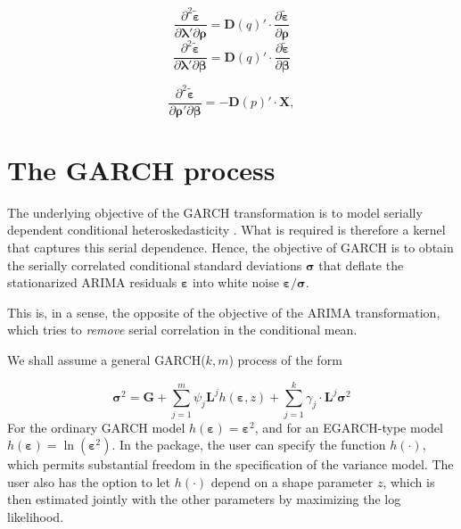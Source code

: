 \documentclass[12pt]{article}
\begin{document}
\begin{equation}
\frac{\partial^{2} \tilde{\boldsymbol{\varepsilon}}}{\partial \boldsymbol{\lambda}' \partial \boldsymbol{\rho}}
= \mathbf{D}(q)' \cdot \frac{\partial \tilde{\boldsymbol{\varepsilon}}}{\partial \boldsymbol{\rho}}
\label{eq:16}
\end{equation}
\begin{equation}
\frac{\partial^{2} \tilde{\boldsymbol{\varepsilon}}}{\partial \boldsymbol{\lambda}' \partial \boldsymbol{\beta}}
= \mathbf{D}(q)' \cdot \frac{\partial \tilde{\boldsymbol{\varepsilon}}}{\partial \boldsymbol{\beta}}
\label{eq:18}
\end{equation}

\begin{equation}
\frac{\partial^{2} \tilde{\boldsymbol{\varepsilon}}}{\partial \boldsymbol{\rho}' \partial \boldsymbol{\beta}}
=- \mathbf{D}(p)' \cdot \mathbf{X},
\label{eq:17}
\end{equation}


\section{The GARCH process}\label{the-garch-process}

The underlying objective of the GARCH transformation is to model serially dependent conditional heteroskedasticity \citep{engle1982autoregressive,bollerslev1986generalized}. What is required is therefore a kernel that captures this serial dependence. Hence, the objective of GARCH is to obtain the serially correlated conditional standard deviations $\mathbf{\sigma}$ that deflate the stationarized ARIMA residuals $\mathbf{\varepsilon}$ into white noise $\mathbf{\varepsilon}/\mathbf{\sigma}$.

This is, in a sense, the opposite of the objective of the ARIMA transformation, which tries to \textit{remove} serial correlation in the conditional mean.


We shall assume a general GARCH($k,m$) process of the form

\begin{equation}
\mathbf{\sigma}^{2} = \mathbf{G} + \sum_{j = 1}^{m}{\psi_{j}\mathbf{\mathbf{L}}^{j}h\left( \mathbf{\varepsilon},z \right)} + \sum_{j = 1}^{k}{\gamma_{j} \cdot \mathbf{\mathbf{L}}^{j}\mathbf{\sigma}^{2}}
\label{eq:19}
\end{equation}
For the ordinary GARCH model $h( \mathbf{\varepsilon} ) = \mathbf{\varepsilon}^{2}$, and for an EGARCH-type model \citep{nelson1991conditional} $h( \mathbf{\varepsilon} ) = \ln\left( \mathbf{\varepsilon}^{2} \right)$. In the package, the user can specify the function $h( \cdot )$, which permits substantial freedom in the specification of the variance model. The user also has the option to let $h(\cdot)$ depend on a shape parameter $z$, which is then estimated jointly with the other parameters by maximizing the log likelihood.
\end{document}
